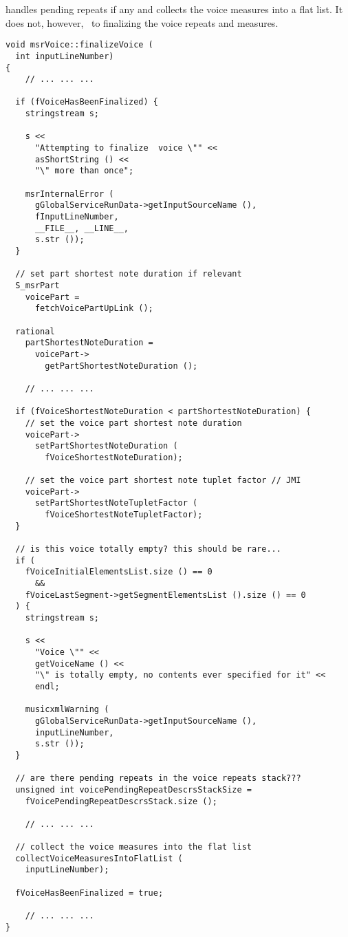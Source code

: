 handles pending repeats if any and collects the voice measures into a flat list. It does not, however, \cascade\ to finalizing the voice repeats and measures.
\begin{lstlisting}[language=CPlusPlus]
void msrVoice::finalizeVoice (
  int inputLineNumber)
{
	// ... ... ...

  if (fVoiceHasBeenFinalized) {
    stringstream s;

    s <<
      "Attempting to finalize  voice \"" <<
      asShortString () <<
      "\" more than once";

    msrInternalError (
      gGlobalServiceRunData->getInputSourceName (),
      fInputLineNumber,
      __FILE__, __LINE__,
      s.str ());
  }

  // set part shortest note duration if relevant
  S_msrPart
    voicePart =
      fetchVoicePartUpLink ();

  rational
    partShortestNoteDuration =
      voicePart->
        getPartShortestNoteDuration ();

	// ... ... ...

  if (fVoiceShortestNoteDuration < partShortestNoteDuration) {
    // set the voice part shortest note duration
    voicePart->
      setPartShortestNoteDuration (
        fVoiceShortestNoteDuration);

    // set the voice part shortest note tuplet factor // JMI
    voicePart->
      setPartShortestNoteTupletFactor (
        fVoiceShortestNoteTupletFactor);
  }

  // is this voice totally empty? this should be rare...
  if (
    fVoiceInitialElementsList.size () == 0
      &&
    fVoiceLastSegment->getSegmentElementsList ().size () == 0
  ) {
    stringstream s;

    s <<
      "Voice \"" <<
      getVoiceName () <<
      "\" is totally empty, no contents ever specified for it" <<
      endl;

    musicxmlWarning (
      gGlobalServiceRunData->getInputSourceName (),
      inputLineNumber,
      s.str ());
  }

  // are there pending repeats in the voice repeats stack???
  unsigned int voicePendingRepeatDescrsStackSize =
    fVoicePendingRepeatDescrsStack.size ();

	// ... ... ...

  // collect the voice measures into the flat list
  collectVoiceMeasuresIntoFlatList (
    inputLineNumber);

  fVoiceHasBeenFinalized = true;

	// ... ... ...
}
\end{lstlisting}


